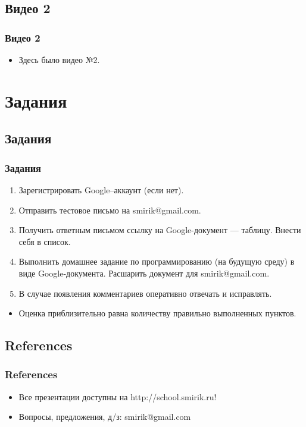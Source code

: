 \documentclass[compress,red]{beamer}
\begin{document}
\subsection{Видео 2}
\begin{frame}[fragile]
  \frametitle{Видео 2}
  \begin{itemize}
    \item Здесь было видео №2.
  \end{itemize}
\end{frame}

\section{Задания}
\subsection{Задания}
\begin{frame}
  \frametitle{Задания}
	\begin{enumerate}
  	\item Зарегистрировать Google--аккаунт (если нет).
  	\item Отправить тестовое письмо на smirik@gmail.com.
  	\item Получить ответным письмом ссылку на Google-документ --- таблицу. Внести себя в список.
  	\item Выполнить домашнее задание по программированию (на будущую среду) в виде Google-документа. Расшарить документ для smirik@gmail.com.
  	\item В случае появления комментариев оперативно отвечать и исправлять.
	\end{enumerate}
	\begin{itemize}
	  \item Оценка приблизительно равна количеству правильно выполненных пунктов.
	\end{itemize}
\end{frame}

\subsection{References}
\begin{frame}[fragile]
  \frametitle{References}
  \begin{itemize}
    \item Все презентации доступны на http://school.smirik.ru!
    \item Вопросы, предложения, д/з: smirik@gmail.com
  \end{itemize}
\end{frame}
\end{document}
